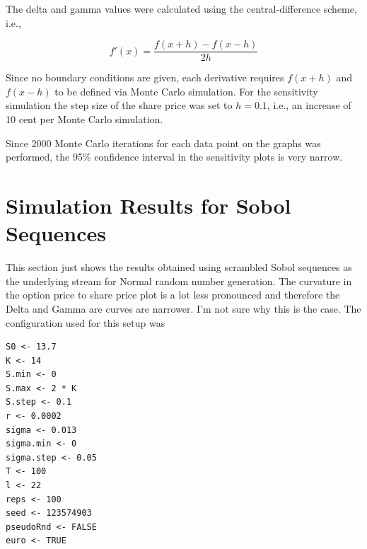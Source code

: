 \documentclass[12pt,a4paper]{article}
\begin{document}
The delta and gamma values were calculated using the
central-difference scheme, i.e.,

\begin{equation}
  \label{eq:central-diff}
  f'(x) = \frac{f(x+h)-f(x-h)}{2h}
\end{equation}

Since no boundary conditions are given, each derivative requires
$f(x+h)$ and $f(x-h)$ to be defined via Monte Carlo simulation. For
the sensitivity simulation the step size of the share price was set to
$h=0.1$, i.e., an increase of 10 cent per Monte Carlo simulation.

Since 2000 Monte Carlo iterations for each data point on the graphs
was performed, the 95\% confidence interval in the sensitivity plots
is very narrow.

\section{Simulation Results for Sobol Sequences}
\label{sec:simul-results-sobol}

This section just shows the results obtained using scrambled Sobol
sequences as the underlying stream for Normal random number
generation. The curvature in the option price to share price plot is a
lot less pronounced and therefore the Delta and Gamma are curves are
narrower. I'm not sure why this is the case. The configuration used
for this setup was

\begin{verbatim}
S0 <- 13.7
K <- 14
S.min <- 0
S.max <- 2 * K
S.step <- 0.1
r <- 0.0002
sigma <- 0.013
sigma.min <- 0
sigma.step <- 0.05
T <- 100
l <- 22
reps <- 100
seed <- 123574903
pseudoRnd <- FALSE
euro <- TRUE
\end{verbatim}
\end{document}
